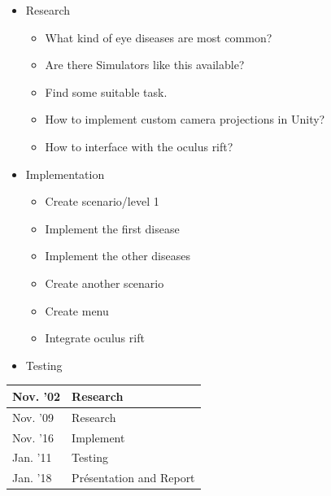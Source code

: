 \documentclass{acm_proc_article-sp}
\newcommand{\todo}[1]{\textcolor{Red}{#1}}
\begin{document}
\begin{itemize}

  \item Research

  \begin{itemize}

    \item What kind of eye diseases are most common?
	
    \item Are there Simulators like this available?
	
    \item Find some suitable task.

    \item How to implement custom camera projections in Unity?

    \item How to interface with the oculus rift?

        
  \end{itemize}

  \item Implementation

  \begin{itemize}

    \item Create scenario/level 1

    \item Implement the first disease

    \item Implement the other diseases 

    \item Create another scenario

    \item Create menu

    \item Integrate oculus rift

  \end{itemize}

  \item Testing

\end{itemize}


\begin{center}

  \begin{tabular}{|l|p{6.5cm}|}

    \hline

    Nov. '02 & Research \\ \hline

    Nov. '09 & Research  \\ \hline

    Nov. '16 & Implement \\ \hline

    Jan. '11 & Testing  \\ \hline

    Jan. '18 & Présentation and Report \\

    \hline

  \end{tabular}

\end{center}

\todo{}
\printbibliography

\balancecolumns
\end{document}
